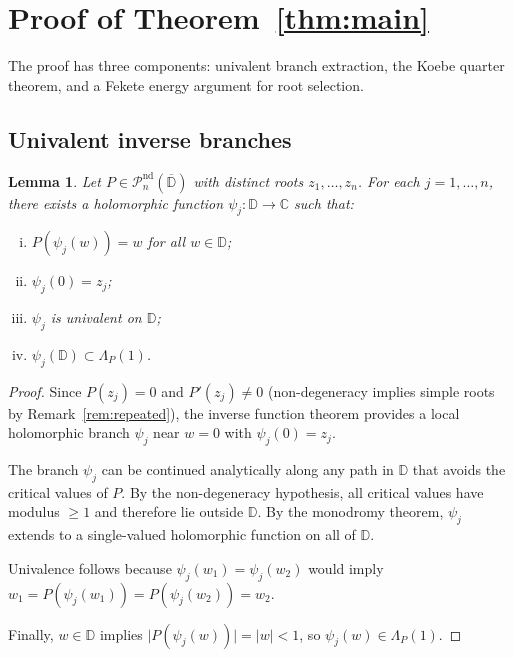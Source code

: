 \documentclass[11pt,a4paper]{amsart}
\newtheorem{lemma}[theorem]{Lemma}
\theoremstyle{definition}
\newcommand{\D}{\mathbb{D}}
\newcommand{\C}{\mathbb{C}}
\newcommand{\Pn}{\mathcal{P}_n}
\newcommand{\abs}[1]{\lvert #1 \rvert}
\begin{document}
\section{Proof of Theorem~\ref{thm:main}}

The proof has three components: univalent branch extraction,
the Koebe quarter theorem, and a Fekete energy argument for root selection.

\subsection{Univalent inverse branches}

\begin{lemma}\label{lem:branch}
Let $P \in \Pn^{\mathrm{nd}}(\overline{\D})$ with distinct roots
$z_1, \ldots, z_n$.  For each $j = 1, \ldots, n$, there exists a
holomorphic function $\psi_j \colon \D \to \C$ such that:
\begin{enumerate}[(i)]
  \item $P(\psi_j(w)) = w$ for all $w \in \D$;
  \item $\psi_j(0) = z_j$;
  \item $\psi_j$ is univalent on $\D$;
  \item $\psi_j(\D) \subset \Lambda_P(1)$.
\end{enumerate}
\end{lemma}

\begin{proof}
Since $P(z_j) = 0$ and $P'(z_j) \neq 0$ (non-degeneracy implies simple
roots by Remark~\ref{rem:repeated}), the inverse function theorem provides a local
holomorphic branch $\psi_j$ near $w = 0$ with $\psi_j(0) = z_j$.

The branch $\psi_j$ can be continued analytically along any path in $\D$
that avoids the critical values of $P$.  By the non-degeneracy hypothesis,
all critical values have modulus $\geq 1$ and therefore lie outside $\D$.
By the monodromy theorem, $\psi_j$ extends to a single-valued holomorphic
function on all of $\D$.

Univalence follows because $\psi_j(w_1) = \psi_j(w_2)$ would imply
$w_1 = P(\psi_j(w_1)) = P(\psi_j(w_2)) = w_2$.

Finally, $w \in \D$ implies $\abs{P(\psi_j(w))} = \abs{w} < 1$, so
$\psi_j(w) \in \Lambda_P(1)$.
\end{proof}
\end{document}
